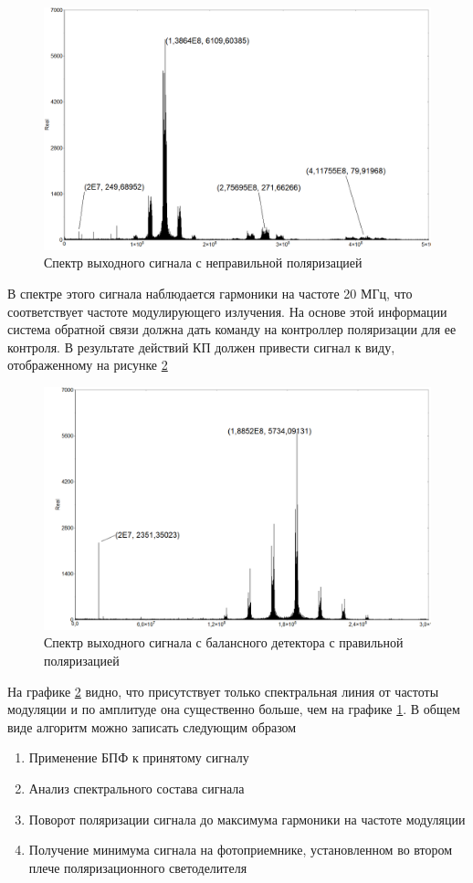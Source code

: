 \begin{figure}
    \centering
    \includegraphics[width = 0.8\linewidth]{images/Spectrum of ruined polarization.png}
    \caption{Спектр выходного сигнала с неправильной поляризацией }
    \label{fig:ruin pol}
\end{figure}
В спектре этого сигнала наблюдается гармоники на частоте 20 МГц, что соответствует частоте модулирующего излучения. На основе этой информации система обратной связи должна дать команду на контроллер поляризации для ее контроля. В результате действий КП должен привести сигнал к виду, отображенному на рисунке \ref{fig:norm pol}
\begin{figure}
    \centering
    \includegraphics[width = 0.8\linewidth]{images/normal polarization.png}
    \caption{Спектр выходного сигнала с балансного детектора с правильной поляризацией}
    \label{fig:norm pol}
\end{figure}
На графике \ref{fig:norm pol} видно, что присутствует только спектральная линия от частоты модуляции и по амплитуде она существенно больше, чем на графике \ref{fig:ruin pol}. 
В общем виде алгоритм можно записать следующим образом
\begin{enumerate}
    \item Применение БПФ к принятому сигналу
    \item Анализ спектрального состава сигнала
    \item Поворот поляризации сигнала до максимума гармоники на частоте модуляции
    \item Получение минимума сигнала на фотоприемнике, установленном во втором плече поляризационного светоделителя
\end{enumerate}
